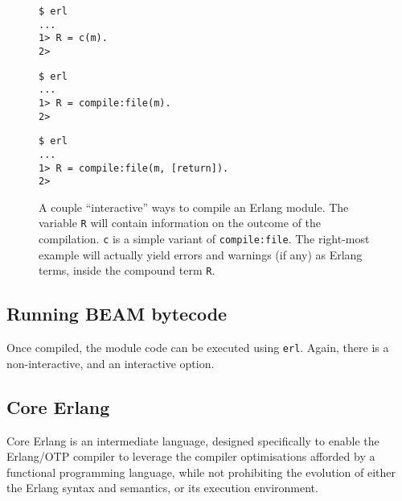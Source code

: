 \begin{figure}[ht!]
\begin{minipage}[t]{0.2\textwidth}
\begin{lstlisting}
$ erl
...
1> R = c(m).
2>
\end{lstlisting}
\end{minipage}%
\begin{minipage}[t]{0.35\textwidth}
\begin{lstlisting}
$ erl
...
1> R = compile:file(m).
2>
\end{lstlisting}
\end{minipage}%
\begin{minipage}[t]{0.45\textwidth}
\begin{lstlisting}
$ erl
...
1> R = compile:file(m, [return]).
2>
\end{lstlisting}
\end{minipage}%
\caption{A couple ``interactive'' ways to compile an Erlang module.
The variable \texttt{R} will contain information on the outcome of the
compilation. \texttt{c} is a simple variant of \texttt{compile:file}.
The right-most example will actually yield errors and warnings (if
any) as Erlang terms, inside the compound term \texttt{R}.}
\label{fig:erl-c}
\end{figure}

\subsection{Running BEAM bytecode}

Once compiled, the module code can be executed using \texttt{erl}.
Again, there is a non-interactive, and an interactive option.

\subsection{Core Erlang}

Core Erlang\cite{erlang:erlang:2001:core-intro, erlang:2004:core-spec}
is an intermediate language, designed specifically to enable the
Erlang/OTP compiler to leverage the compiler optimisations afforded by
a functional programming language, while not prohibiting the evolution
of either the Erlang syntax and semantics, or its execution
environment.

